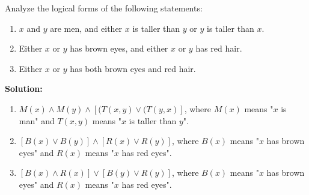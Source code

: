 Analyze the logical forms of the following statements:
\begin{enumerate}[label=(\alph*)]
    \item $x$ and $y$ are men, and either $x$ is taller than $y$ or $y$ is taller than $x$.
    \item Either $x$ or $y$ has brown eyes, and either $x$ or $y$ has red hair.
    \item Either $x$ or $y$ has both brown eyes and red hair.
\end{enumerate}

\textbf{Solution:}
\begin{enumerate}[label=(\alph*)]
\item $M(x) \wedge M(y) \wedge [(T(x,y) \vee (T(y,x)]$, where $M(x)$ means "$x$ is man" and $T(x,y)$ means "$x$ is taller than $y$".
\item $[B(x) \vee B(y)] \wedge [R(x) \vee R(y)]$, where $B(x)$ means "$x$ has brown eyes" and $R(x)$ means "$x$ has red eyes".
\item $[B(x) \wedge R(x)] \vee [B(y) \vee R(y)]$, where $B(x)$ means "$x$ has brown eyes" and $R(x)$ means "$x$ has red eyes".
\end{enumerate}

\pagebreak